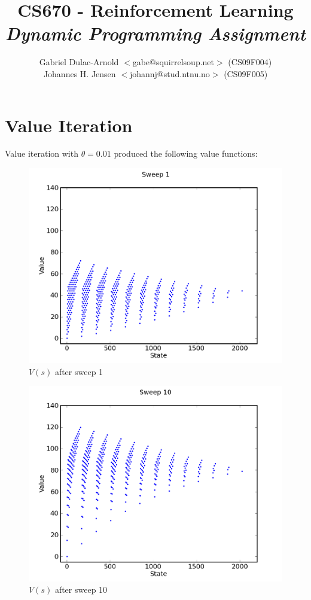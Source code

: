 \documentclass[a4paper]{article}
\author{Gabriel Dulac-Arnold $<$gabe@squirrelsoup.net$>$ (CS09F004) \\
Johannes H. Jensen $<$johannj@stud.ntnu.no$>$ (CS09F005)}
\title{CS670 - Reinforcement Learning \\
\emph{Dynamic Programming Assignment}}
\begin{document}
\setlength{\parskip}{2ex}
\maketitle

\section{Value Iteration}

Value iteration with $\theta=0.01$ produced the following value functions:

\begin{figure}[h]
\center
\includegraphics[scale=0.75]{value_iteration/sweep_1.png}
\caption{$V(s)$ after sweep 1}
\end{figure}

\begin{figure}[p]
\center
\includegraphics[scale=0.75]{value_iteration/sweep_10.png}
\caption{$V(s)$ after sweep 10}
\end{figure}
\end{document}
